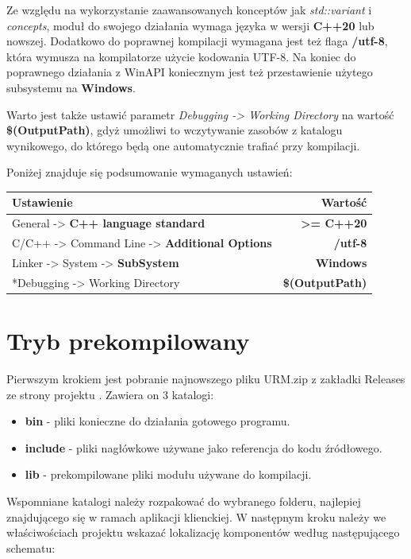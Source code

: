 Ze względu na wykorzystanie zaawansowanych konceptów jak \textit{std::variant} i \textit{concepts}, moduł do swojego działania wymaga języka w wersji \textbf{C++20} lub nowszej. Dodatkowo do poprawnej kompilacji wymagana jest też flaga \textbf{/utf-8}, która wymusza na kompilatorze użycie kodowania UTF-8. Na koniec do poprawnego działania z WinAPI koniecznym jest też przestawienie użytego subsystemu na \textbf{Windows}.

Warto jest także ustawić parametr \textit{Debugging -> Working Directory} na wartość \textbf{\$(OutputPath)}, gdyż umożliwi to wczytywanie zasobów z katalogu wynikowego, do którego będą one automatycznie trafiać przy kompilacji.

Poniżej znajduje się podsumowanie wymaganych ustawień:

\begin{center}
	\begin{tabular}{ |l r|}
		\hline
		\textbf{Ustawienie} & \textbf{Wartość} \\
		\hline
		General -> \textbf{C++ language standard}  & \textbf{>= C++20} \\
		C/C++ -> Command Line -> \textbf{Additional Options} & \textbf{/utf-8} \\
		Linker -> System -> \textbf{SubSystem} & \textbf{Windows} \\
		*Debugging -> Working Directory & \textbf{\$(OutputPath)} \\
		\hline
	\end{tabular}
\end{center}

\section*{Tryb prekompilowany}
Pierwszym krokiem jest pobranie najnowszego pliku URM.zip z zakładki Releases ze strony projektu \cite{GitHub:Minik:MasterThesisUniversalRenderingModuleD3D11}. Zawiera on 3 katalogi:

\begin{itemize}
	\item \textbf{bin} - pliki konieczne do działania gotowego programu.
	\item \textbf{include} - pliki nagłówkowe używane jako referencja do kodu źródłowego.
	\item \textbf{lib} - prekompilowane pliki modułu używane do kompilacji. 
\end{itemize}

Wspomniane katalogi należy rozpakować do wybranego folderu, najlepiej znajdującego się w ramach aplikacji klienckiej. W następnym kroku należy we właściwościach projektu wskazać lokalizację komponentów według następującego schematu:

